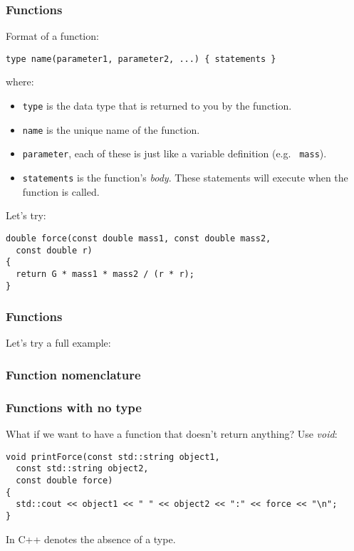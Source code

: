 \documentclass{beamer}
\begin{document}
\begin{frame}[fragile]
  \frametitle{Functions}

  Format of a function:
  \begin{lstlisting}
type name(parameter1, parameter2, ...) { statements }  
  \end{lstlisting}
  where:
  \begin{itemize}
    \item<2->{\texttt{type} is the data type that is returned to you by the function.}
    \item<3->{\texttt{name} is the unique name of the function.}
    \item<4->{\texttt{parameter}, each of these is just like a variable definition (e.g. \texttt{ mass}).}
    \item<5->{\texttt{statements} is the function's \textit{body}.  These statements will execute when the function is called.}
  \end{itemize}
  \pause[6]
  Let's try:
  \begin{lstlisting}
double force(const double mass1, const double mass2,
  const double r)
{
  return G * mass1 * mass2 / (r * r);
}
  \end{lstlisting}
\end{frame}


\begin{frame}[fragile]
  \frametitle{Functions}

  Let's try a full example:
  
\end{frame}

\begin{frame}
  \frametitle{Function nomenclature}
  
  
\end{frame}

\begin{frame}[fragile]
  \frametitle{Functions with no type}
  
  What if we want to have a function that doesn't return anything?\newline
  \pause
  Use \textit{void}:
  \begin{lstlisting}
void printForce(const std::string object1,
  const std::string object2,
  const double force)
{
  std::cout << object1 << " " << object2 << ":" << force << "\n";
}
  \end{lstlisting}
  In C++  denotes the absence of a type.
\end{frame}
\end{document}
